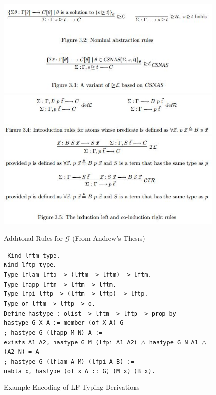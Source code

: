 \documentclass[12pt]{article}
\begin{document}
\begin{figure}
\includegraphics{Figure3-3.JPG}
\includegraphics{Figure3-4.JPG}
\includegraphics{Figure3-5.JPG}
\caption{Additonal Rules for $\mathcal{G}$ (From Andrew's Thesis)}\label{fig:metalogicG2}
\end{figure}

\begin{figure}
{\tt
Kind lftm type.\\
Kind lftp type.\\

Type lflam lftp -> (lftm -> lftm) -> lftm.\\
Type lfapp lftm -> lftm -> lftm.\\
Type lfpi lftp -> (lftm -> lftp) -> lftp.\\

Type of lftm -> lftp -> o.\\

Define hastype : olist -> lftm -> lftp -> prop by\\
  hastype G X A := member (of X A) G\\
; hastype G (lfapp M N) A := \\ 
      exists A1 A2, hastype G M (lfpi A1 A2) $\wedge$ hastype G N A1 $\wedge$ (A2 N) = A\\
; hastype G (lflam A M) (lfpi A B) := \\
      nabla x, hastype (of x A :: G) (M x) (B x).
}
\caption{Example Encoding of LF Typing Derivations}\label{fig:LFdef}
\end{figure}
\end{document}
